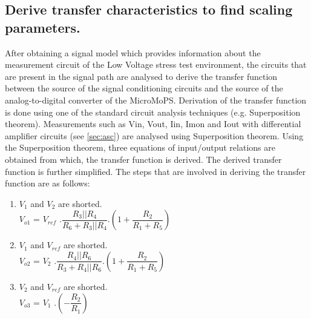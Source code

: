 		\subsection{Derive transfer characteristics to find scaling parameters.}\label{sec:Transfer Function}
		After obtaining a signal model which provides information about the measurement circuit of the Low Voltage stress test environment, the circuits that are present in the signal path are analysed to derive the transfer function between the source of the signal conditioning circuits and the source of the analog-to-digital converter of the MicroMoPS. 
		Derivation of the transfer function is done using one of the standard circuit analysis techniques (e.g. Superposition theorem).  
Measurements such as \gls{Vin}, \gls{Vout}, \gls{Iin}, \gls{Imon} and \gls{Iout} with differential amplifier circuits (see \cref{sec:asc}) are analysed using Superposition theorem. 
Using the Superposition theorem, three equations of input/output relations are obtained from which, the transfer function is derived. 
The derived transfer function is further simplified. The steps that are involved in deriving the transfer function are as follows: 

\begin{enumerate}
  \centering
\item $V_1$ and $V_2$ are shorted.\\
	\vspace{4mm}
	\hspace{30mm}
	  	$V_{o1}$ = $V_{ref}$ .$\dfrac{R_3||R_4}{R_6 + R_3||R_4}$.$\left(1 + \dfrac{R_2}{R_1 + R_5}\right)$
\item $V_1$ and $V_{ref}$ are shorted.\\
	\vspace{4mm}
	\hspace{28mm}
	  $V_{o2}$ = $V_{2}$ .$\dfrac{R_4||R_6}{R_3 + R_4||R_6}$.$\left(1 + \dfrac{R_2}{R_1 + R_5}\right)$
\item $V_2$ and $V_{ref}$ are shorted.\\
	\vspace{4mm}
	\hspace{-9mm}
	  $V_{o3}$ = $V_{1}$ .$\left(-\dfrac{R_2}{R_1}\right)$
\end{enumerate}

